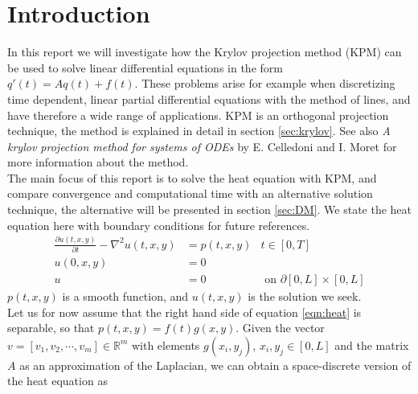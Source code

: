 \chapter{Introduction}%

In this report we will investigate how the Krylov projection method (KPM)  can be used to solve linear differential equations in the form $q'(t)=Aq(t)+f(t)$. These problems arise for example when discretizing time dependent, linear partial differential equations with the method of lines, and have therefore a wide range of applications. 
KPM is an orthogonal projection technique, the method is explained in detail in section \ref{sec:krylov}. See also \textit{A krylov projection method for systems of ODEs} by E. Celledoni and I. Moret \cite{elena} for more information about the method. \\


The main focus of this report is to solve the heat equation with KPM, and compare convergence and computational time with an alternative solution technique, the alternative will be presented in section \ref{sec:DM}.
We state the heat equation here with boundary conditions for future references. \\
\begin{equation} \label{eqn:heat}
\begin{aligned}
\frac{\partial u(t,x,y)}{\partial t} - \nabla^2 u(t,x,y) &= p(t,x,y) & t \in [0,T]\\
u(0,x,y) &= 0 \\
u & = 0 			&\text{ on } \partial [0,L] \times [0,L]
\end{aligned}
\end{equation}
$p(t,x,y)$ is a smooth function, and $u(t,x,y)$ is the solution we seek.\\

Let us for now assume that the right hand side of equation \eqref{eqn:heat} is separable, so that $p(t,x,y) = f(t)g(x,y) $. 
Given the vector $v = [v_1,v_2, \cdots, v_m] \in \mathbb{R}^m $ with elements $ g(x_i,y_j)$, $x_i,y_j \in [0,L]$ and the matrix $A$ as an approximation of the Laplacian, we can obtain a space-discrete version of the heat equation as

